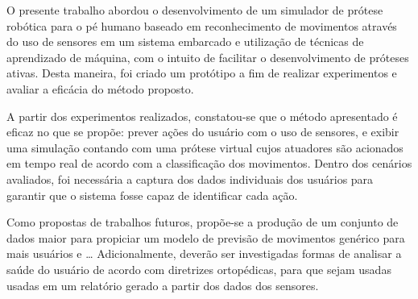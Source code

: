 O presente trabalho abordou o desenvolvimento de um simulador de prótese robótica para o pé humano baseado em reconhecimento de movimentos através do uso de sensores em um sistema embarcado e utilização de técnicas de aprendizado de máquina, com o intuito de facilitar o desenvolvimento de próteses ativas. Desta maneira, foi criado um protótipo a fim de realizar experimentos e avaliar a eficácia do método proposto.

A partir dos experimentos realizados, constatou-se que o método apresentado é eficaz no que se propõe: prever ações do usuário com o uso de sensores, e exibir uma simulação contando com uma prótese virtual cujos atuadores são acionados em tempo real de acordo com a classificação dos movimentos. Dentro dos cenários avaliados, foi necessária a captura dos dados individuais dos usuários para garantir que o sistema fosse capaz de identificar cada ação.

Como propostas de trabalhos futuros, propõe-se a produção de um conjunto de dados maior para propiciar um modelo de previsão de movimentos genérico para mais usuários e \ldots{} Adicionalmente, deverão ser investigadas formas de analisar a saúde do usuário de acordo com diretrizes ortopédicas, para que sejam usadas usadas em um relatório gerado a partir dos dados dos sensores.